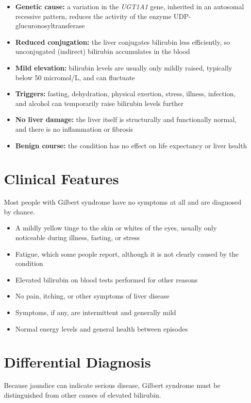 \begin{itemize}
    \item \textbf{Genetic cause:} a variation in the \textit{UGT1A1} gene, inherited in an autosomal recessive pattern, reduces the activity of the enzyme UDP-glucuronosyltransferase
    \item \textbf{Reduced conjugation:} the liver conjugates bilirubin less efficiently, so unconjugated (indirect) bilirubin accumulates in the blood
    \item \textbf{Mild elevation:} bilirubin levels are usually only mildly raised, typically below 50 micromol/L, and can fluctuate
    \item \textbf{Triggers:} fasting, dehydration, physical exertion, stress, illness, infection, and alcohol can temporarily raise bilirubin levels further
    \item \textbf{No liver damage:} the liver itself is structurally and functionally normal, and there is no inflammation or fibrosis
    \item \textbf{Benign course:} the condition has no effect on life expectancy or liver health
\end{itemize}

\section*{Clinical Features}
Most people with Gilbert syndrome have no symptoms at all and are diagnosed by chance.

\begin{itemize}
    \item A mildly yellow tinge to the skin or whites of the eyes, usually only noticeable during illness, fasting, or stress
    \item Fatigue, which some people report, although it is not clearly caused by the condition
    \item Elevated bilirubin on blood tests performed for other reasons
    \item No pain, itching, or other symptoms of liver disease
    \item Symptoms, if any, are intermittent and generally mild
    \item Normal energy levels and general health between episodes
\end{itemize}

\section*{Differential Diagnosis}
Because jaundice can indicate serious disease, Gilbert syndrome must be distinguished from other causes of elevated bilirubin.

